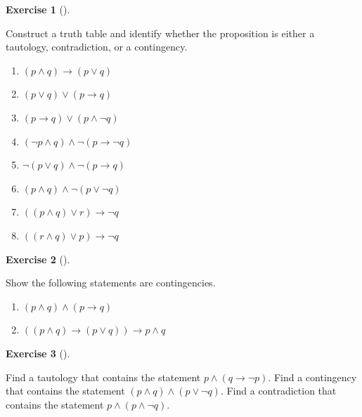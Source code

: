 \documentclass[
  letterpaper,
  10pt,
  reqno,
  twopage,
  openany]{book}
\providecommand{\tightlist}{%
  \setlength{\itemsep}{0pt}\setlength{\parskip}{0pt}}\usepackage{longtable,booktabs,array}
\theoremstyle{plain}
\theoremstyle{definition}
\newtheorem{exercise}{Exercise}[chapter]
\theoremstyle{definition}
\theoremstyle{definition}
\theoremstyle{plain}
\theoremstyle{plain}
\theoremstyle{remark}
\begin{document}
\leavevmode{}%
\begin{exercise}[]\label{exr-1-3}

Construct a truth table and identify whether the proposition is either a
tautology, contradiction, or a contingency.

\begin{enumerate}
\def\labelenumi{\arabic{enumi}.}
\tightlist
\item
  \((p\land q)\rightarrow (p\lor q)\)
\item
  \((p\lor q)\lor (p\rightarrow q)\)
\item
  \((p\rightarrow q)\lor (p\land \neg q)\)
\item
  \((\neg p\land q) \land \neg (p\rightarrow \neg q)\)
\item
  \(\neg (p\lor q)\land \neg (p\rightarrow q)\)
\item
  \((p\land q)\land \neg (p\lor \neg q)\)
\item
  \(((p\land q)\lor r) \rightarrow \neg q\)
\item
  \(((r\land q)\lor p) \rightarrow \neg q\)
\end{enumerate}

\end{exercise}

\leavevmode{}%
\begin{exercise}[]\label{exr-1-4}

Show the following statements are contingencies.

\begin{enumerate}
\def\labelenumi{\arabic{enumi}.}
\tightlist
\item
  \((p\land q)\land (p\rightarrow q)\)
\item
  \(((p\land q)\rightarrow (p\lor q))\rightarrow p\land q\)
\end{enumerate}

\end{exercise}

\leavevmode{}%
\begin{exercise}[]\label{exr-1-5}

Find a tautology that contains the statement
\(p\land (q\rightarrow \neg p)\). Find a contingency that contains the
statement \((p\land q)\land (p\lor \neg q)\). Find a contradiction that
contains the statement \(p\land (p\land \neg q)\).

\end{exercise}
\end{document}
